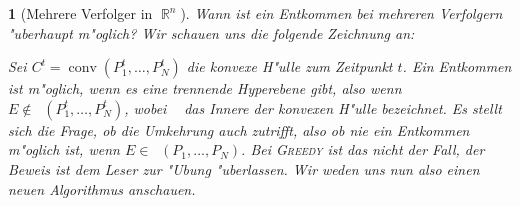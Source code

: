 \documentclass[paper=A4, twoside, chapterprefix=true, bibliography=totoc, headsepline]{scrbook}
\newcommand{\tikzgitter}[3][0.25]{ %
	\draw[step=#1,gray!15] #2 grid #3;
	\draw[step=2*#1,gray!30] #2 grid #3;
	\fill (0,0) circle(0.1); 
}
\DeclareMathOperator{\R}{\mathbb{R}}
\DeclareMathOperator{\conv}{conv} %
\DeclareMathOperator{\convo}{\stackrel{\circ}{\conv}} %
\newcommand{\kapit}[1]{\textsc{#1}\xspace} %
\newcommand{\Greedy}{\kapit{Greedy}}
\theoremstyle{break}
\theoremstyle{nonumberbreak}
\theoremstyle{emptybreak}
\newtheorem{emptythm}{}%
\theoremstyle{break}
\begin{document}
\begin{emptythm}[Mehrere Verfolger in $\R^n$]
Wann ist ein Entkommen bei mehreren Verfolgern "uberhaupt m"oglich? Wir schauen uns die folgende Zeichnung an:
\begin{center}\end{center}
Sei $C^t = \conv(P_1^t, \ldots, P_N^t)$ die konvexe H"ulle zum Zeitpunkt $t$.
Ein Entkommen ist m"oglich, wenn es eine trennende Hyperebene gibt, also wenn $E \notin \convo(P_1^t, \ldots, P_N^t)$, wobei $\convo$ das Innere der konvexen H"ulle bezeichnet.
Es stellt sich die Frage, ob die Umkehrung auch zutrifft, also ob nie ein Entkommen m"oglich ist, wenn $E \in \convo(P_1, \ldots, P_N)$.
Bei \Greedy ist das nicht der Fall, der Beweis ist dem Leser zur "Ubung "uberlassen.
Wir weden uns nun also einen neuen Algorithmus anschauen.
\end{emptythm}
\end{document}
